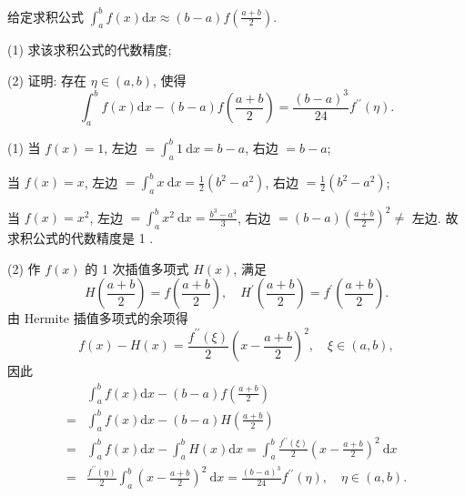  
\begin{tcolorbox}[enhanced,colback=10,colframe=9,breakable,coltitle=green!25!black,title=2024]
给定求积公式 $\displaystyle \int_{a}^{b} f(x) \mathrm{d} x \approx(b-a) f\left(\frac{a+b}{2}\right) $.

(1) 求该求积公式的代数精度;

(2) 证明: 存在 $ \eta \in(a, b) $, 使得
$$
\int_{a}^{b} f(x) \mathrm{d} x-(b-a) f\left(\frac{a+b}{2}\right)=\frac{(b-a)^{3}}{24} f^{\prime \prime}(\eta) .
$$
\tcblower

 (1) 当 $ f(x)=1 $, 左边 $ =\int_{a}^{b} 1 \mathrm{~d} x=b-a $, 右边 $ =b-a $;
 
当 $ f(x)=x $, 左边 $ =\int_{a}^{b} x \mathrm{~d} x=\frac{1}{2}\left(b^{2}-a^{2}\right) $, 右边 $ =\frac{1}{2}\left(b^{2}-a^{2}\right) $;

当 $ f(x)=x^{2} $, 左边 $ =\int_{a}^{b} x^{2} \mathrm{~d} x=\frac{b^{3}-a^{3}}{3} $, 右边 $ =(b-a)\left(\frac{a+b}{2}\right)^{2} \neq $ 左边.
故求积公式的代数精度是 1 .

(2) 作 $ f(x) $ 的 1 次插值多项式 $ H(x) $, 满足
$$
H\left(\frac{a+b}{2}\right)=f\left(\frac{a+b}{2}\right), \quad H^{\prime}\left(\frac{a+b}{2}\right)=f^{\prime}\left(\frac{a+b}{2}\right) .
$$
由 Hermite 插值多项式的余项得
$$
f(x)-H(x)=\frac{f^{\prime \prime}(\xi)}{2}\left(x-\frac{a+b}{2}\right)^{2}, \quad \xi \in(a, b),
$$
因此
$$
\begin{aligned}
& \int_{a}^{b} f(x) \mathrm{d} x-(b-a) f\left(\frac{a+b}{2}\right) \\
= & \int_{a}^{b} f(x) \mathrm{d} x-(b-a) H\left(\frac{a+b}{2}\right) \\
= & \int_{a}^{b} f(x) \mathrm{d} x-\int_{a}^{b} H(x) \mathrm{d} x=\int_{a}^{b} \frac{f^{\prime \prime}(\xi)}{2}\left(x-\frac{a+b}{2}\right)^{2} \mathrm{~d} x \\
= & \frac{f^{\prime \prime}(\eta)}{2} \int_{a}^{b}\left(x-\frac{a+b}{2}\right)^{2} \mathrm{~d} x=\frac{(b-a)^{3}}{24} f^{\prime \prime}(\eta), \quad \eta \in(a, b) .
\end{aligned}
$$
\end{tcolorbox}








